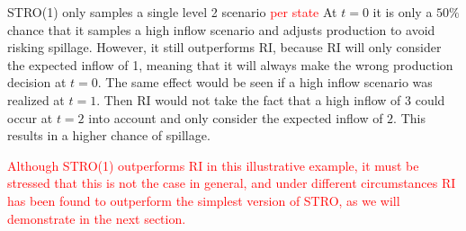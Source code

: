 STRO(1) only samples a single level 2 scenario \textcolor{red}{per state}  At $t=0$ it is only a $50\%$ chance that it samples a high inflow scenario and adjusts production to avoid risking spillage. However, it still outperforms RI, because RI will only consider the expected inflow of 1, meaning that it will always make the wrong production decision at $t=0$. The same effect would be seen if a high inflow scenario was realized at $t=1$. Then RI would not take the fact that a high inflow of 3 could occur at $t=2$ into account and only consider the expected inflow of $2$. This results in a higher chance of spillage. 

\textcolor{red}{Although STRO(1) outperforms RI in this illustrative example, it must be stressed that this is not the case in general, and under different circumstances RI has been found to outperform the simplest version of STRO, as we will demonstrate in the next section.}

